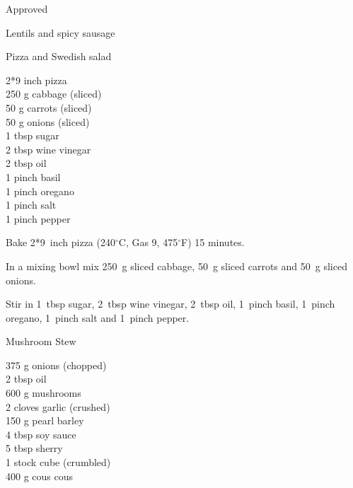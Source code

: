 \begin{menu}{Approved}
\begin{recipe}{2}{Lentils and spicy sausage}
\begin{instructions}
    \end{instructions}
    \end{recipe}%
  
    \begin{recipe}{1}{Pizza and Swedish salad}%
    
		\begin{ingredients}
		2*9 inch pizza  \\
	250 g cabbage (sliced) \\
	50 g carrots (sliced) \\
	50 g onions (sliced) \\
	1 tbsp sugar  \\
	2 tbsp wine vinegar  \\
	2 tbsp oil  \\
	1 pinch basil  \\
	1 pinch oregano  \\
	1 pinch salt  \\
	1 pinch pepper  \\
	
		\end{ingredients}
	
	
    \begin{instructions}
    \item 
        Bake 2*9~inch  pizza
      (240$^{\circ}$C, Gas 9, 475$^{\circ}$F)
     15 minutes.
      \item 
        In a mixing bowl mix
        250~g sliced cabbage,
        50~g sliced carrots
        and
        50~g sliced onions.
      \item 
        Stir in
        1~tbsp  sugar,
        2~tbsp  wine vinegar,
        2~tbsp  oil,
        1~pinch  basil,
        1~pinch  oregano,
        1~pinch  salt
        and
        1~pinch  pepper.
      
    \end{instructions}
    \end{recipe}%
  
    \begin{recipe}{2}{Mushroom Stew}%
    
		\begin{ingredients}
		375 g onions (chopped) \\
	2 tbsp oil  \\
	600 g mushrooms  \\
	2 cloves garlic (crushed) \\
	150 g pearl barley  \\
	4 tbsp soy sauce  \\
	5 tbsp sherry  \\
	1  stock cube (crumbled) \\
	400 g cous cous  \\
	

\end{ingredients}
\end{recipe}
\end{menu}
